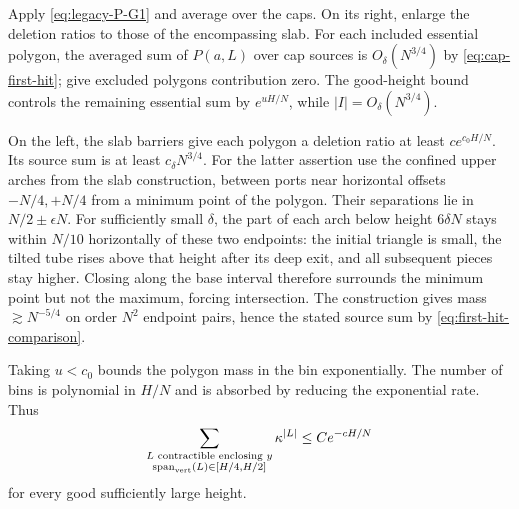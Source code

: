 Apply \eqref{eq:legacy-P-G1} and average over the caps. On its right, enlarge the deletion ratios to those of the encompassing slab. For each included essential polygon, the averaged sum of $P(a,L)$ over cap sources is $O_\delta(N^{3/4})$ by \eqref{eq:cap-first-hit}; give excluded polygons contribution zero. The good-height bound controls the remaining essential sum by $e^{uH/N}$, while $|I|=O_\delta(N^{3/4})$.

On the left, the slab barriers give each polygon a deletion ratio at least $ce^{c_0H/N}$. Its source sum is at least $c_\delta N^{3/4}$. For the latter assertion use the confined upper arches from the slab construction, between ports near horizontal offsets $-N/4,+N/4$ from a minimum point of the polygon. Their separations lie in $N/2\pm\epsilon N$. For sufficiently small $\delta$, the part of each arch below height $6\delta N$ stays within $N/10$ horizontally of these two endpoints: the initial triangle is small, the tilted tube rises above that height after its deep exit, and all subsequent pieces stay higher. Closing along the base interval therefore surrounds the minimum point but not the maximum, forcing intersection. The construction gives mass $\gtrsim N^{-5/4}$ on order $N^2$ endpoint pairs, hence the stated source sum by \eqref{eq:first-hit-comparison}.

Taking $u<c_0$ bounds the polygon mass in the bin exponentially. The number of bins is polynomial in $H/N$ and is absorbed by reducing the exponential rate. Thus
\begin{equation}\label{eq:good-contractible-span}
 \sum_{\substack{L\text{ contractible enclosing }y\\
        \operatorname{span}_{\rm vert}(L)\in[H/4,H/2]}}
       \kappa^{|L|}\le Ce^{-cH/N}
\end{equation}
for every good sufficiently large height.

